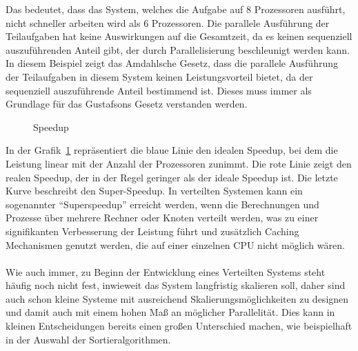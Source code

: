 \documentclass[../vs-script-first-v01.tex]{subfiles}
\begin{document}
\begin{itemize}
{        Das bedeutet, dass das System, welches die Aufgabe auf 8 Prozessoren ausführt, nicht schneller arbeiten wird als 6 Prozessoren. Die parallele Ausführung der Teilaufgaben hat keine Auswirkungen auf die Gesamtzeit, da es keinen sequenziell auszuführenden Anteil gibt, der durch Parallelisierung beschleunigt werden kann.
}
        In diesem Beispiel zeigt das Amdahlsche Gesetz, dass die parallele Ausführung der Teilaufgaben in diesem System keinen Leistungsvorteil bietet, da der sequenziell auszuführende Anteil bestimmend ist. Dieses muss immer als Grundlage für das Gustafsons Gesetz verstanden werden.

        \begin{figure}[!h]
          \centering
          \caption{Speedup}
          \label{fig:speedup}
        \end{figure}

        In der Grafik~\ref{fig:speedup} repräsentiert die blaue Linie den idealen Speedup, bei dem die Leistung linear mit der Anzahl der Prozessoren zunimmt. Die rote Linie zeigt den realen Speedup, der in der Regel geringer als der ideale Speedup ist. Die letzte Kurve beschreibt den Super-Speedup.
        In verteilten Systemen kann ein sogenannter \enquote{Superspeedup} erreicht werden, wenn die Berechnungen und Prozesse über mehrere Rechner oder Knoten verteilt werden, was zu einer signifikanten Verbesserung der Leistung führt und zusätzlich Caching Mechanismen genutzt werden, die auf einer einzelnen CPU nicht möglich wären.\\
        \\
        Wie auch immer, zu Beginn der Entwicklung eines Verteilten Systems steht häufig noch nicht fest, inwieweit das System langfristig skalieren soll, daher sind auch schon kleine Systeme mit ausreichend Skalierungsmöglichkeiten zu designen und damit auch mit einem hohen Maß an möglicher Parallelität. Dies kann in kleinen Entscheidungen bereits einen großen Unterschied machen, wie beispielhaft in der Auswahl der Sortieralgorithmen.
\examplevs{ 
}
\end{itemize}
\end{document}
